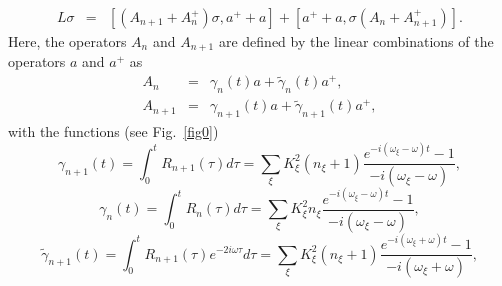 \documentclass[12pt,twoside,a4paper]{report}
\begin{document}
\begin{eqnarray}
  L\sigma 
       &=&  \left[ 
                  \left( 
                     A_{n+1}+A_n^{+}
                  \right) 
               \sigma ,
               a^{+}+a 
            \right]
          + \left[ 
                a^{+}+a,
                \sigma 
                   \left( 
                      A_n+A_{n+1}^{+}
                   \right) 
            \right].
  \label{8a-HO}
\end{eqnarray}
Here, the operators $A_n$ and $A_{n+1}$ are defined by the linear
combinations of the operators $a$ and $a^{+}$ as
\begin{eqnarray}
     A_n &=&       \gamma _n  \left( t\right) a
           +\tilde{\gamma}_n  \left(t\right) a^{+},
                                          \nonumber \\ 
 A_{n+1} &=&       \gamma _{n+1} \left( t\right) a
           +\tilde{\gamma}_{n+1} \left( t\right)a^{+}, 
\label{10-HO}
\end{eqnarray}
with the functions (see Fig.~\ref{fig0})
\begin{equation}
        \gamma _{n+1}(t)
            =\int_0^tR_{n+1}(\tau )d\tau 
            =\sum_\xi K_\xi^2 (n_\xi+1)
                  \frac
                       {e^{-{{i}}(\omega _\xi -\omega)t}-1}
                       {-{{i}}(\omega _\xi -\omega )},
\label{10a-HO}
\end{equation}
\begin{equation}
        \gamma _n(t)
            =\int_0^tR_n(\tau )d\tau 
            =\sum_\xi K_\xi ^2 n_\xi
                  \frac
                       {e^{-{{i}}(\omega _\xi -\omega )t}-1}
                       {-{{i}}(\omega _\xi -\omega )},
\label{10b-HO}
\end{equation}
\begin{equation}
\tilde{\gamma} _{n+1}(t)
           =\int_0^tR_{n+1}(\tau ) e^{-2{{i}}\omega\tau }d\tau 
           =\sum_\xi K_\xi ^2 (n_\xi+1)
                 \frac
                      {e^{-{{i}}(\omega _\xi +\omega )t}-1}
                      {-{{i}}(\omega _\xi +\omega)}, 
\label{10c-HO}
\end{equation}
\end{document}
